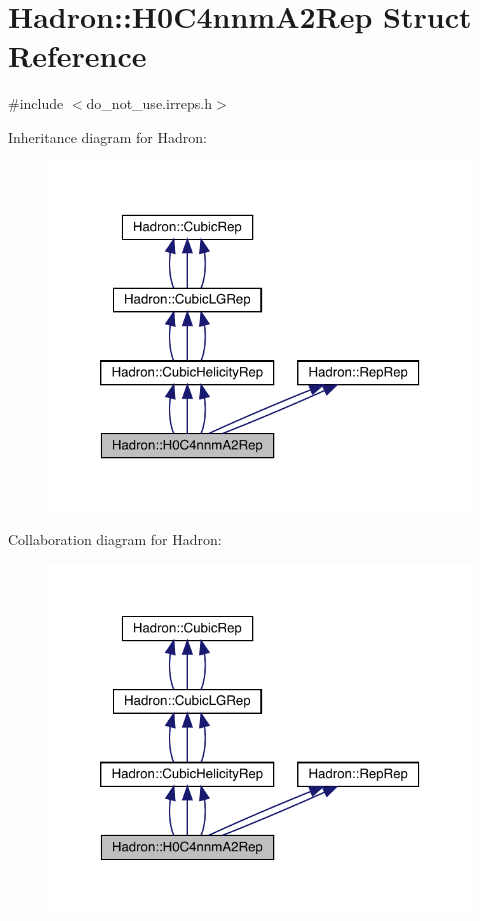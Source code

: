 \hypertarget{structHadron_1_1H0C4nnmA2Rep}{}\section{Hadron\+:\+:H0\+C4nnm\+A2\+Rep Struct Reference}
\label{structHadron_1_1H0C4nnmA2Rep}


{\ttfamily \#include $<$do\+\_\+not\+\_\+use.\+irreps.\+h$>$}



Inheritance diagram for Hadron\+:
\nopagebreak
\begin{figure}[H]
\begin{center}
\leavevmode
\includegraphics[width=320pt]{dd/db0/structHadron_1_1H0C4nnmA2Rep__inherit__graph}
\end{center}
\end{figure}


Collaboration diagram for Hadron\+:
\nopagebreak
\begin{figure}[H]
\begin{center}
\leavevmode
\includegraphics[width=320pt]{d3/d17/structHadron_1_1H0C4nnmA2Rep__coll__graph}
\end{center}
\end{figure}
